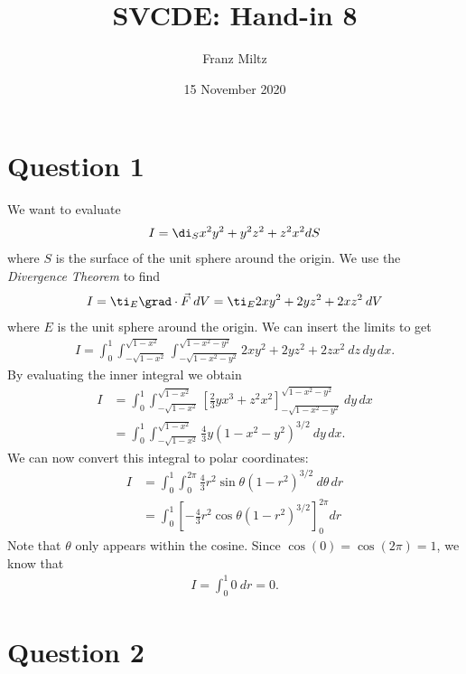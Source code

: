 \documentclass{article}
\begin{document}
\title{SVCDE: Hand-in 8}
\author{Franz Miltz}
\date{15 November 2020}
\maketitle


\section*{Question 1}


We want to evaluate
\begin{align*}
    I = \di_S x^2y^2+y^2z^2+z^2x^2 dS
\end{align*}
where $S$ is the surface of the unit sphere around the origin. 
We use the \emph{Divergence Theorem} to find
\begin{align*}
    I = \ti_E \grad\cdot\vec F\:dV = \ti_E 2xy^2 + 2yz^2 + 2xz^2\:dV
\end{align*}
where $E$ is the unit sphere around the origin. We can insert the limits to get
\begin{align*}
    I = \int_0^1 \int_{-\sqrt{1-x^2}}^{\sqrt{1-x^2}} \int_{-\sqrt{1-x^2-y^2}}^{\sqrt{1-x^2-y^2}}
    2xy^2 + 2yz^2 + 2zx^2\:dz\,dy\,dx.
\end{align*}
By evaluating the inner integral we obtain
\begin{align*}
    I &= \int_0^1 \int_{-\sqrt{1-x^2}}^{\sqrt{1-x^2}}
    \left[\frac{2}{3}yx^3 + z^2x^2\right]_{-\sqrt{1-x^2-y^2}}^{\sqrt{1-x^2-y^2}}\:dy\,dx\\
    &= \int_0^1 \int_{-\sqrt{1-x^2}}^{\sqrt{1-x^2}}
    \frac{4}{3}y(1-x^2-y^2)^{3/2}\: dy\,dx.
\end{align*}
We can now convert this integral to polar coordinates:
\begin{align*}
    I &= \int_0^1 \int_0^{2\pi}\frac{4}{3}r^2\sin\theta (1-r^2)^{3/2}\:d\theta\,dr\\
    &=\int_0^1\left[-\frac{4}{3}r^2\cos\theta(1-r^2)^{3/2}\right]_0^{2\pi}dr
\end{align*}
Note that $\theta$ only appears within the cosine. Since $\cos(0)=\cos(2\pi)=1$,
we know that
\begin{align*}
    I = \int_0^1 0\:dr = 0.
\end{align*}


\section*{Question 2}
\end{document}
